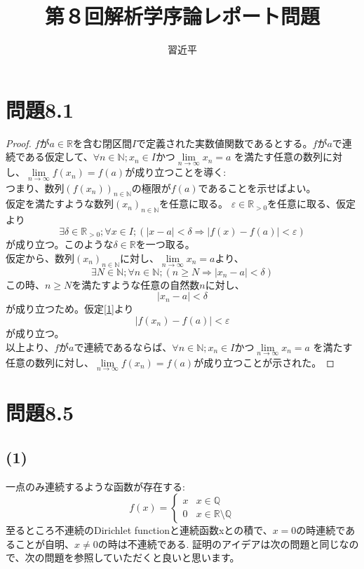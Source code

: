 \documentclass{jarticle}
\begin{document}
\title{第８回解析学序論レポート問題}
\author{習近平}
\maketitle
\newpage
\tableofcontents
{}
\newpage
\section{問題8.1}
\begin{proof}
$f$が$a \in \mathbb{R}$を含む閉区間$I$で定義された実数値関数であるとする。$f$が$a$で連続である仮定して、$\forall n \in \mathbb{N} ; x_n \in I$かつ$\lim\limits_{n \to \infty} x_n =a$
を満たす任意の数列に対し、$\lim\limits_{n \to \infty} f(x_n) =f(a)$が成り立つことを導く:\\
	つまり、数列$\left( f(x_n) \right)_{n \in \mathbb{N}}$の極限が$f(a)$であることを示せばよい。\\
仮定を満たすような数列$(x_n)_{n\in \mathbb{N}}$を任意に取る。
$\varepsilon \in \mathbb{R}_{>0}$を任意に取る、仮定より
\begin{equation}
	\exists \delta \in \mathbb{R}_{>0}; \forall x \in I ; \left( |x-a|<\delta \Rightarrow |f(x) - f(a)| <  \varepsilon \right) \label{1}
\end{equation}
が成り立つ。このような$\delta \in \mathbb{R} $を一つ取る。\\
仮定から、数列$(x_n)_{n\in \mathbb{N}}$に対し、$\lim\limits_{n\to \infty} x_n =a$より、\\
$$
	\exists N \in \mathbb{N}; \forall n \in \mathbb{N} ; ( n \ge N \Rightarrow  |x_n -a | < \delta )
$$
この時、$n \ge N$を満たすような任意の自然数$n$に対し、\\
$$
	|x_n -a| < \delta
$$
	が成り立つため。仮定\ref{1}より\\
$$
	|f(x_n) - f(a)| < \varepsilon
$$
が成り立つ。\\
以上より、$f$が$a$で連続であるならば、$\forall n \in \mathbb{N} ; x_n \in I$かつ$\lim\limits_{n \to \infty} x_n =a$
を満たす任意の数列に対し、$\lim\limits_{n \to \infty} f(x_n) =f(a)$が成り立つことが示された。
\end{proof}
\newpage
\section{問題8.5}
\subsection{(1)}
一点のみ連続するような函数が存在する:
\begin{equation}
	f(x) =
	\begin{cases}
		 x &x \in \mathbb{Q}\\
		 0 &x \in \mathbb{R}\setminus \mathbb{Q}
	\end{cases}
\end{equation}
至るところ不連続のDirichlet functionと連続函数xとの積で、$x=0$の時連続であることが自明、$x \ne 0$の時は不連続である. 証明のアイデアは次の問題と同じなので、次の問題を参照していただくと良いと思います。
\end{document}
